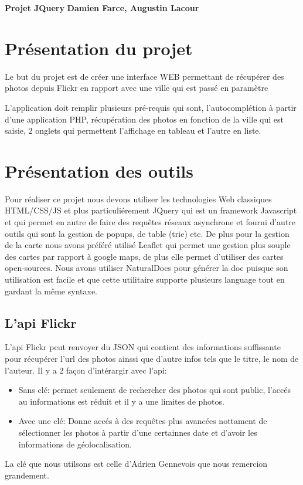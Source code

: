 \documentclass[a4paper, 11pt]{article}
\begin{document}
\noindent
\large\textbf{Projet JQuery} \hfill \textbf{Damien Farce, Augustin Lacour} \\

\section*{Présentation du projet}
Le but du projet est de créer une interface WEB permettant de récupérer des photos depuis Flickr en rapport avec une ville qui est passé en paramètre

L'application doit remplir plusieurs pré-requis qui sont, l'autocomplétion à partir d'une application PHP, récupération des photos en fonction de la ville qui est saisie, 2 onglets qui permettent l'affichage en tableau et l'autre en liste.

\section*{Présentation des outils}
Pour réaliser ce projet nous devons utiliser les technologies Web classiques HTML/CSS/JS et plus particuliérement JQuery qui est un framework Javascript et qui permet en autre de faire des requêtes réseaux asynchrone et fourni d'autre outils qui sont la gestion de popups, de table (trie) etc.
De plus pour la gestion de la carte nous avons préféré utilisé Leaflet qui permet une gestion plus souple des cartes par rapport à google maps, de plus elle permet d'utiliser des cartes open-sources.
Nous avons utiliser NaturalDocs pour générer la doc puisque son utilisation est facile et que cette utilitaire supporte plusieurs language tout en gardant la même syntaxe. 
\subsection*{L'api Flickr}
L'api Flickr peut renvoyer du JSON qui contient des informations suffissante pour récupérer l'url des photos ainssi que d'autre infos tels que le titre, le nom de l'auteur. 
Il y a 2 façon d'intérargir avec l'api:
	\begin{itemize}
		\item Sans clé: permet seulement de rechercher des photos qui sont public, l'accés au informations est réduit et il y a une limites de photos.
		\item Avec une clé: Donne accés à des requêtes plus avancées nottament de sélectionner les photos à partir d'une certainnes date et d'avoir les informations de géolocalisation.
	\end{itemize}
La clé que nous utilsons est celle d'Adrien Gennevois que nous remercion grandement. 
\end{document}
